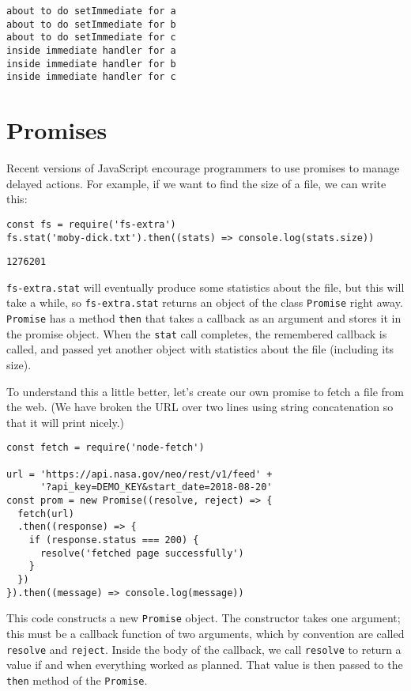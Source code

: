 \begin{verbatim}
about to do setImmediate for a
about to do setImmediate for b
about to do setImmediate for c
inside immediate handler for a
inside immediate handler for b
inside immediate handler for c
\end{verbatim}

\section{Promises}\label{s:promises-promises}

Recent versions of JavaScript encourage programmers to use promises to manage delayed actions.
For example,
if we want to find the size of a file,
we can write this:

\begin{verbatim}
const fs = require('fs-extra')
fs.stat('moby-dick.txt').then((stats) => console.log(stats.size))
\end{verbatim}

\begin{verbatim}
1276201
\end{verbatim}

\texttt{fs-extra.stat} will eventually produce some statistics about the file,
but this will take a while,
so \texttt{fs-extra.stat} returns an object of the class \texttt{Promise} right away.
\texttt{Promise} has a method \texttt{then} that takes a callback as an argument and stores it in the promise object.
When the \texttt{stat} call completes,
the remembered callback is called,
and passed yet another object with statistics about the file (including its size).

To understand this a little better,
let's create our own promise to fetch a file from the web.
(We have broken the URL over two lines using string concatenation
so that it will print nicely.)

\begin{verbatim}
const fetch = require('node-fetch')

url = 'https://api.nasa.gov/neo/rest/v1/feed' +
      '?api_key=DEMO_KEY&start_date=2018-08-20'
const prom = new Promise((resolve, reject) => {
  fetch(url)
  .then((response) => {
    if (response.status === 200) {
      resolve('fetched page successfully')
    }
  })
}).then((message) => console.log(message))
\end{verbatim}

This code constructs a new \texttt{Promise} object.
The constructor takes one argument;
this must be a callback function of two arguments,
which by convention are called \texttt{resolve} and \texttt{reject}.
Inside the body of the callback,
we call \texttt{resolve} to return a value if and when everything worked as planned.
That value is then passed to the \texttt{then} method of the \texttt{Promise}.

